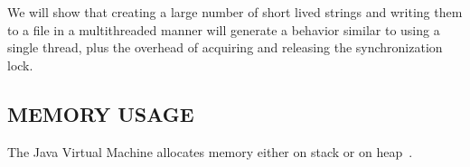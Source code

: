 \documentclass[a4paper,twoside]{article}
\begin{document}
%

We will show that creating a large number of short lived strings and writing them to a file in a multithreaded manner will generate a behavior similar to using a single thread, plus the overhead of acquiring and releasing the synchronization lock.


%



\subsection{\uppercase{Memory Usage}}\label{subsec:uppercase12}

The Java Virtual Machine allocates memory either on stack or on heap~\cite{lindholm:2014}.
\end{document}
